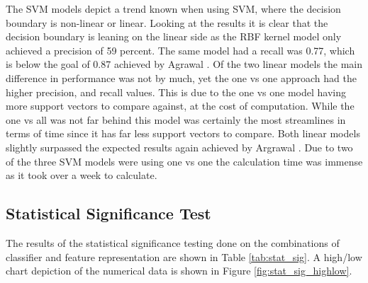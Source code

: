 \documentclass[conference]{sig-alternate-05-2015}
\begin{document}
The SVM models depict a trend known when using SVM, where the decision boundary
is non-linear or linear. Looking at the results it is clear that the decision
boundary is leaning on the linear side as the RBF kernel model only achieved a
precision of 59 percent. The same model had a recall was 0.77, which is below
the goal of 0.87 achieved by Agrawal \cite{agrawal2018deep}.  Of the two linear
models the main difference in performance was not by much, yet the one vs one
approach had the higher precision, and recall values. This is due to the one vs
one model having more support vectors to compare against, at the cost of
computation. While the one vs all was not far behind this model was certainly
the most streamlines in terms of time since it has far less support vectors to
compare. Both linear models slightly surpassed the expected results again
achieved by Argrawal \cite{agrawal2018deep}. Due to two of the three SVM models
were using one vs one the calculation time was immense as it took over a week to
calculate.\par

\subsection{Statistical Significance Test}\label{subsec:stat_sig_discussion}

The results of the statistical significance testing done on the combinations of
classifier and feature representation are shown in Table \ref{tab:stat_sig}. A
high/low chart depiction of the numerical data is shown in Figure
\ref{fig:stat_sig_highlow}.
\end{document}
